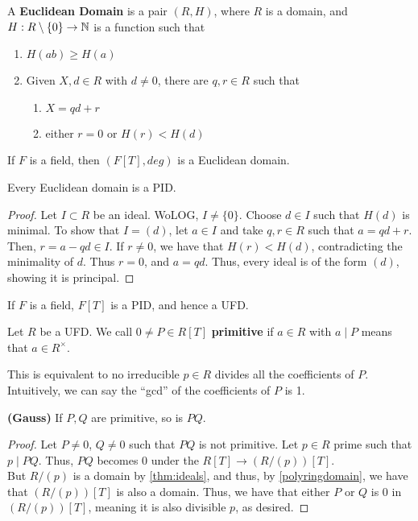 \begin{defn}
    A \textbf{Euclidean Domain} is a pair $(R, H)$, where $R$ is a domain, and
    $H: R \setminus \{0\} \rightarrow \mathbb{N}$ is a function such that
    \begin{enumerate}
        \item $H(ab) \geq H(a)$
        \item Given $X,d \in R$ with $d \neq 0$, there are $q, r \in R$ such that
        \begin{enumerate}
            \item $X = qd + r$
            \item either $r = 0$ or $H(r) < H(d)$
        \end{enumerate}
    \end{enumerate}
\end{defn}
\begin{ex}
    If $F$ is a field, then $(F[T], deg)$ is a Euclidean domain.
\end{ex}
\begin{prop}
    Every Euclidean domain is a PID.
\end{prop}
\begin{proof}
    Let $I \subset R$ be an ideal. WoLOG, $I \neq \{0\}$. Choose $d \in I$ such
    that $H(d)$ is minimal. To show that $I = (d)$, let $a \in I$ and take $q,r \in R$
    such that $a = qd + r$. Then, $r = a - qd \in I$. If $r \neq 0$, we have that $H(r) < H(d)$,
    contradicting the minimality of $d$. Thus $r = 0$, and $a = qd$. Thus,
    every ideal is of the form $(d)$, showing it is principal.
\end{proof}
\begin{cor}
    If $F$ is a field, $F[T]$ is a PID, and hence a UFD.
\end{cor}
\begin{defn}
    Let $R$ be a UFD. We call $0 \neq P \in R[T]$ \textbf{primitive} if $a \in R$
    with $a \mid P$ means that $a \in R^\times$.
\end{defn}
\begin{rmk}
    This is equivalent to no irreducible $p \in R$ divides all the coefficients of
    $P$. Intuitively, we can say the ``gcd'' of the coefficients of $P$ is 1.
\end{rmk}
\begin{lemma}
    \textbf{(Gauss)} If $P,Q$ are primitive, so is $PQ$.
\end{lemma}
\begin{proof}
    Let $P \neq 0$, $Q \neq 0$ such that $PQ$ is not primitive. Let $p \in R$ prime
    such that $p \mid PQ$. Thus, $PQ$ becomes $0$ under the
    $R[T] \rightarrow (R/(p))[T]$. \\
    But $R / (p)$ is a domain by \ref{thm:ideals}, and thus, by \ref{polyringdomain}, we have
    that $(R/(p))[T]$ is also a domain. Thus, we have that either $P$ or $Q$ is
    0 in $(R / (p))[T]$, meaning it is also divisible $p$, as desired.
\end{proof}
